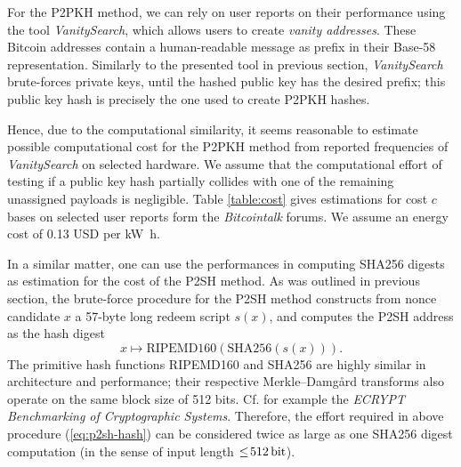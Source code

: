 \documentclass[a4paper,11pt,titlepage]{scrbook}
\begin{document}
For the {P2PKH} method, we can rely on user reports on their performance using the tool \emph{VanitySearch}, which allows users to create \emph{vanity addresses}.
These Bitcoin addresses contain a human-readable message as prefix in their Base-58 representation. \cite[Cf.][82--83]{antonopoulos_mastering_2017}
Similarly to the presented tool in previous section, \emph{VanitySearch} brute-forces private keys, until the hashed public key has the desired prefix;
this public key hash is precisely the one used to create {P2PKH} hashes.

Hence, due to the computational similarity, it seems reasonable to estimate possible computational cost for the {P2PKH} method from reported frequencies of \emph{VanitySearch} on selected hardware.
We assume that the computational effort of testing if a public key hash partially collides with one of the remaining unassigned payloads is negligible.
Table \ref{table:cost} gives estimations for cost $c$ bases on selected user reports form the \emph{Bitcointalk} forums.
We assume an energy cost of \num{.13} USD per \si{\kilo\watt\hour}. 

In a similar matter, one can use the performances in computing {SHA256} digests as estimation for the cost of the {P2SH} method.
As was outlined in previous section, the brute-force procedure for the {P2SH} method constructs from nonce candidate $x$ a 57-byte long redeem script $s(x)$, and computes the {P2SH} address as the hash digest 
\begin{equation}
    x \mapsto \text{{RIPEMD160}}(\text{{SHA256}}(s(x))).\label{eq:p2sh-hash}
\end{equation}
The primitive hash functions {RIPEMD160} and {SHA256} are highly similar in architecture and performance; their respective Merkle–Damgård transforms also operate on the same block size of 512 bits. 
Cf. for example the \emph{ECRYPT Benchmarking of Cryptographic Systems}. \cite{bernstein_benchmark}
Therefore, the effort required in above procedure (\ref{eq:p2sh-hash}) can be considered twice as large as one {SHA256} digest computation (in the sense of input length $\leq\!\SI{512}{\bit}$). 
\end{document}
